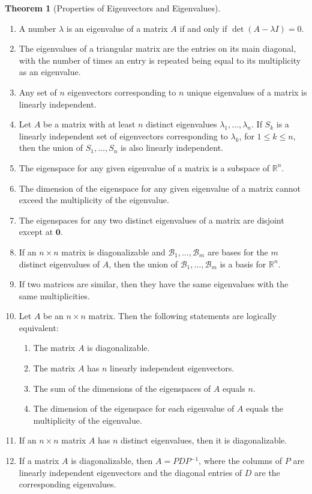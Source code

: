 \documentclass{myart}
\renewcommand{\vec}[1]{\ensuremath{\mathbf{#1}}} %
\newcommand{\mat}[1]{\ensuremath{#1}} %
\newcommand{\R}[1][]{\ensuremath{\mathbb{R}^{#1}}} %
\newcommand{\by}{\ensuremath{\times}} %
\newcommand{\inv}{\ensuremath{^{-1}}} %
\newcommand{\basis}[1]{\ensuremath{\mathcal{#1}}} %
\newcommand{\many}[2][n]{\ensuremath{{#2}_1, \ldots, {#2}_{#1}}} %
\theoremstyle{definition}
\newtheorem{thm}{Theorem}
\begin{document}
\begin{thm}[Properties of Eigenvectors and Eigenvalues] \hfill
\begin{enumerate}
\item A number $\lambda$ is an eigenvalue of a matrix \mat A if and only if $\det(\mat A - \lambda\mat I) = 0$.
\item The eigenvalues of a triangular matrix are the entries on its main diagonal, with the number of times an entry is repeated being equal to its multiplicity as an eigenvalue.
\item Any set of $n$ eigenvectors corresponding to $n$ unique eigenvalues of a matrix is linearly independent.
\item Let \mat A be a matrix with at least $n$ distinct eigenvalues \many{\lambda}. If $S_k$ is a linearly independent set of eigenvectors corresponding to $\lambda_k$, for $1 \leq k \leq n$, then the union of \many{S} is also linearly independent.
\item The eigenspace for any given eigenvalue of a matrix is a subspace of \R[n].
\item The dimension of the eigenspace for any given eigenvalue of a matrix cannot exceed the multiplicity of the eigenvalue.
\item The eigenspaces for any two distinct eigenvalues of a matrix are disjoint except at \vec 0.
\item If an $n \by n$ matrix is diagonalizable and \many[m]{\basis B} are bases for the $m$ distinct eigenvalues of \mat A, then the union of \many[m]{\basis B} is a basis for \R[n].
\item If two matrices are similar, then they have the same eigenvalues with the same multiplicities.
\item Let \mat A be an $n \by n$ matrix. Then the following statements are logically equivalent:
\begin{enumerate}
\item The matrix \mat A is diagonalizable.
\item The matrix \mat A has $n$ linearly independent eigenvectors.
\item The sum of the dimensions of the eigenspaces of \mat A equals $n$.
\item The dimension of the eigenspace for each eigenvalue of \mat A equals the multiplicity of the eigenvalue.
\end{enumerate}
\item If an $n \by n$ matrix \mat A has $n$ distinct eigenvalues, then it is diagonalizable.
\item If a matrix \mat A is diagonalizable, then $\mat A = \mat P\mat D\mat P\inv$, where the columns of \mat P are linearly independent eigenvectors and the diagonal entries of \mat D are the corresponding eigenvalues.

\end{enumerate}
\end{thm}
\end{document}
